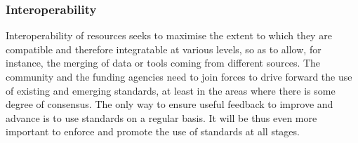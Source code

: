 \documentclass[10pt, plain]{../../metanetpaper}
\begin{document}
\begin{multicols}{2}
\subsubsection{Interoperability}
\label{sec:interoperability}

Interoperability of resources seeks to maximise the extent to which they are compatible and therefore integratable at various levels, so as to allow, for instance, the merging of data or tools coming from different sources. %
The community and the funding agencies need to join forces to drive forward the use of existing and emerging standards, at least in the areas where there is some degree of consensus. The only way to ensure useful feedback to improve and advance is to use standards on a regular basis. It will be thus even more important to enforce and promote the use of standards at all stages.


\end{multicols}
\end{document}
